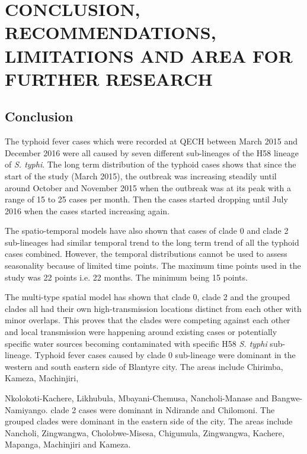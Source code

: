 
\chapter{CONCLUSION, RECOMMENDATIONS, LIMITATIONS AND AREA FOR FURTHER RESEARCH}

\section{Conclusion}

The typhoid fever cases which were recorded at QECH between March 2015 and December 2016 were all caused by seven different sub-lineages of the H58 lineage of \textit{S. typhi}. The long term distribution of the typhoid cases shows that since the start of the study (March 2015), the outbreak was increasing steadily until around October and November 2015 when the outbreak was at its peak with a range of 15 to 25 cases per month. Then the cases started dropping until July 2016 when the cases started increasing again.

The spatio-temporal models have also shown that cases of clade 0 and clade 2 sub-lineages had similar temporal trend to the long term trend of all the typhoid cases combined. However, the temporal distributions cannot be used to assess seasonality because of limited time points. The maximum time points used in the study was 22 points i.e. 22 months. The minimum being 15 points.

The multi-type spatial model has shown that clade 0, clade 2 and the grouped clades all had their own high-transmission locations distinct from each other with minor overlaps. This proves that the clades were competing against each other and local transmission were happening around existing cases or potentially specific water sources becoming contaminated with specific H58 \textit{S. typhi} sub-lineage. Typhoid fever cases caused by clade 0 sub-lineage were dominant in the western and south eastern side of Blantyre city. The areas include Chirimba, Kameza, Machinjiri, 

\restoregeometry

Nkolokoti-Kachere, Likhubula, Mbayani-Chemusa, Nancholi-Manase and Bangwe-Namiyango. clade 2 cases were dominant in Ndirande and Chilomoni. The grouped clades were dominant in the eastern side of the city. The areas include Nancholi, Zingwangwa, Cholobwe-Misesa, Chigumula, Zingwangwa, Kachere, Mapanga, Machinjiri and Kameza.


